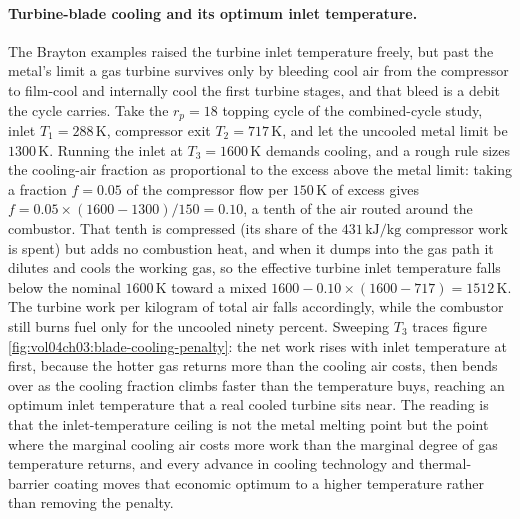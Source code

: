 \paragraph{Turbine-blade cooling and its optimum inlet temperature.} The Brayton
examples raised the turbine inlet temperature freely, but past the metal's limit a
gas turbine survives only by bleeding cool air from the compressor to film-cool and
internally cool the first turbine stages, and that bleed is a debit the cycle
carries. Take the $r_p = 18$ topping cycle of the combined-cycle study, inlet
$T_1 = 288\,\si{\kelvin}$, compressor exit $T_2 = 717\,\si{\kelvin}$, and let the
uncooled metal limit be $1300\,\si{\kelvin}$. Running the inlet at $T_3 =
1600\,\si{\kelvin}$ demands cooling, and a rough rule sizes the cooling-air
fraction as proportional to the excess above the metal limit: taking a fraction
$f = 0.05$ of the compressor flow per $150\,\si{\kelvin}$ of excess gives $f =
0.05 \times (1600 - 1300)/150 = 0.10$, a tenth of the air routed around the
combustor. That tenth is compressed (its share of the $431\,\text{kJ}/\text{kg}$
compressor work is spent) but adds no combustion heat, and when it dumps into the
gas path it dilutes and cools the working gas, so the effective turbine inlet
temperature falls below the nominal $1600\,\si{\kelvin}$ toward a mixed
$1600 - 0.10 \times (1600 - 717) = 1512\,\si{\kelvin}$. The turbine work per
kilogram of total air falls accordingly, while the combustor still burns fuel only
for the uncooled ninety percent. Sweeping $T_3$ traces figure
\ref{fig:vol04ch03:blade-cooling-penalty}: the net work rises with inlet
temperature at first, because the hotter gas returns more than the cooling air
costs, then bends over as the cooling fraction climbs faster than the temperature
buys, reaching an optimum inlet temperature that a real cooled turbine sits near.
The reading is that the inlet-temperature ceiling is not the metal melting point
but the point where the marginal cooling air costs more work than the marginal
degree of gas temperature returns, and every advance in cooling technology and
thermal-barrier coating moves that economic optimum to a higher temperature rather
than removing the penalty.



